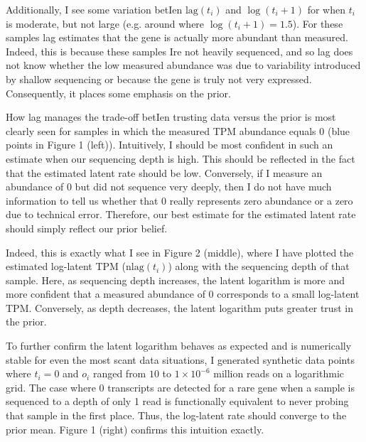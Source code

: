 \documentclass[11pt]{article}
\begin{document}
Additionally, I see some variation betIen $\textrm{lag}(t_i)$ and $\log(t_i + 1)$ for when $t_i$ is moderate, but not large (e.g. around where $\log(t_i + 1) = 1.5$). For these samples lag estimates that the gene is actually more abundant than measured. Indeed, this is because these samples Ire not heavily sequenced, and so lag does not know whether the low measured abundance was due to variability introduced by shallow sequencing or because the gene is truly not very expressed. Consequently, it places some emphasis on the prior.

How lag manages the trade-off betIen trusting data versus the prior is most clearly seen for samples in which the measured TPM abundance equals 0 (blue points in Figure 1 (left)). Intuitively, I should be most confident in such an estimate when our sequencing depth is high. This should be reflected in the fact that the estimated latent rate should be low. Conversely, if I measure an abundance of 0 but did not sequence very deeply, then I do not have much information to tell us whether that 0 really represents zero abundance or a zero due to technical error. Therefore, our best estimate for the estimated latent rate should simply reflect our prior belief. 

Indeed, this is exactly what I see in Figure 2 (middle), where I have plotted the estimated log-latent TPM ($\textrm{nlag}(t_i)$) along with the sequencing depth of that sample. Here, as sequencing depth increases, the latent logarithm is more and more confident that a measured abundance of 0 corresponds to a small log-latent TPM. Conversely, as depth decreases, the latent logarithm puts greater trust in the prior.

To further confirm the latent logarithm behaves as expected and is numerically stable for even the most scant data situations, I generated synthetic data points where $t_i = 0$ and $o_i$ ranged from $10$ to $1 \times 10^{-6}$ million reads on a logarithmic grid. The case where 0 transcripts are detected for a rare gene when a sample is sequenced to a depth of only 1 read is functionally equivalent to never probing that sample in the first place. Thus, the log-latent rate should converge to the prior mean. Figure 1 (right) confirms this intuition exactly.
\end{document}
